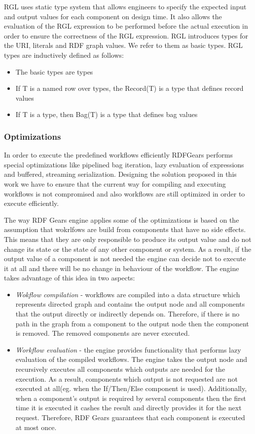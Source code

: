 RGL uses static type system that allows engineers to specify the expected input and output values for each component on design time. It also allows the evaluation of the RGL expression to be performed before the actual execution in order to ensure the correctness of the RGL expression. RGL introduces types for the URI, literals and RDF graph values. We refer to them as basic types. RGL types are inductively defined as follows:

\begin{itemize}
	\item The basic types are types
	\item If T is a named row over types, the Record(T) is a type that defines record values
	\item If T is a type, then Bag(T) is a type that defines bag values
\end{itemize}

\subsubsection{Optimizations}

In order to execute the predefined workflows efficiently RDFGears performs special optimizations like pipelined bag iteration, lazy evaluation of expressions and buffered, streaming serialization. Designing the solution proposed in this work we have to ensure that the current way for compiling and executing workflows is not compromised and also workflows are still optimized in order to execute efficiently. 

The way RDF Gears engine applies some of the optimizations is based on the assumption that wokrlfows are build from components that have no side effects. This means that they are only responsible to produce its output value and do not change its state or the state of any other component or system. As a result, if the output value of a component is not needed the engine can decide not to execute it at all and there will be no change in behaviour of the workflow. The engine takes advantage of this idea in two aspects:
	\begin{itemize}
		\item \textit{Wokflow compilation} - workflows are compiled into a data structure which represents directed graph and contains the output node and all components that the output directly or indirectly depends on. Therefore, if there is no path in the graph from a component to the output node then the component is removed. The removed components are never executed.
		
		\item \textit{Workflow evaluation} - the engine provides functionality that performs lazy evaluation of the compiled workflows. The engine takes the output node and recursively executes all components which outputs are needed for the execution. As a result, components which output is not requested are not executed at all(eg. when the If/Then/Else component is used). Additionally, when a component's output is required by several components then the first time it is executed it cashes the result and directly provides it for the next request. Therefore, RDF Gears guarantees that each component is executed at most once.
\end{itemize}
